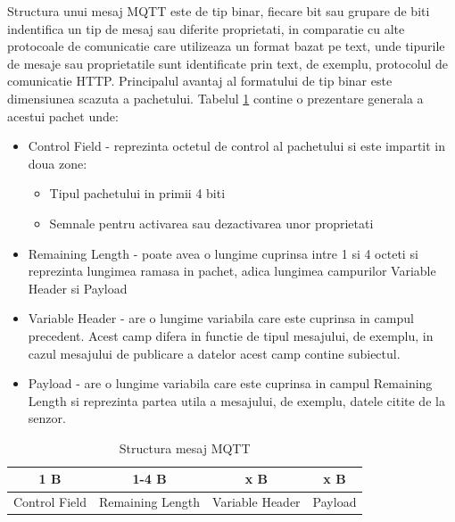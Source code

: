 Structura unui mesaj MQTT este de tip binar, fiecare bit sau grupare de biti indentifica un tip de mesaj sau diferite proprietati, in comparatie cu alte 
protocoale de comunicatie care utilizeaza un format bazat pe text, unde tipurile de mesaje sau proprietatile sunt identificate prin text, de exemplu,
protocolul de comunicatie HTTP. Principalul avantaj al formatului de tip binar este dimensiunea scazuta a pachetului. Tabelul \ref{tab:StructuraMesajMQTT} 
contine o prezentare generala a acestui pachet unde:
\begin{itemize}
	\item Control Field - reprezinta octetul de control al pachetului si este impartit in doua zone:
    \begin{itemize}
        \item Tipul pachetului in primii 4 biti
        \item Semnale pentru activarea sau dezactivarea unor proprietati
    \end{itemize}
	\item Remaining Length - poate avea o lungime cuprinsa intre 1 si 4 octeti si reprezinta lungimea ramasa in pachet, adica lungimea campurilor Variable Header 
    si Payload
	\item Variable Header - are o lungime variabila care este cuprinsa in campul precedent. Acest camp difera in functie de tipul mesajului, de exemplu, in 
	cazul mesajului de publicare a datelor acest camp contine subiectul.
	\item Payload - are o lungime variabila care este cuprinsa in campul Remaining Length si reprezinta partea utila a mesajului, de exemplu, datele citite de 
	la senzor.
\end{itemize}

\begin{table}[ht]
    \caption{Structura mesaj MQTT}
    \centering                          %
    \begin{tabular}{|c|c|c|c|}          %
        \hline
        1 B & 1-4 B & x B & x B \\ [0.5ex]   %
        \hline                              %
        Control Field & Remaining Length & Variable Header & Payload \\               %
        \hline
    \end{tabular}
    \label{tab:StructuraMesajMQTT}                %
\end{table}

